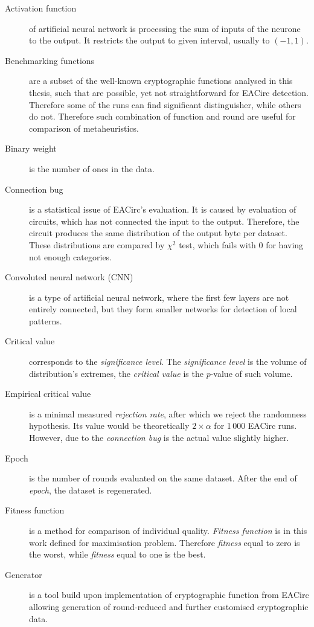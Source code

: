 \documentclass[
    digital,    %
    oneside,    %
    color,
    11pt,
    nocover,
    notable,
    nolof,
    nolot,
]{fithesis3}
\begin{document}
\begin{description}
    \item[Activation function] of artificial neural network is processing the sum of inputs of the neurone to the output. It restricts the output to given interval, usually to $(-1, 1)$.
    \item[Benchmarking functions] are a subset of the well-known cryptographic functions analysed in this thesis, such that are possible, yet not straightforward for EACirc detection. Therefore some of the runs can find significant distinguisher, while others do not. Therefore such combination of function and round are useful for comparison of metaheuristics.
    \item[Binary weight] is the number of ones in the data.
    \item[Connection bug] is a statistical issue of EACirc's evaluation. It is caused by evaluation of circuits, which has not connected the input to the output. Therefore, the circuit produces the same distribution of the output byte per dataset. These distributions are compared by $\chi^{2}$ test, which fails with 0 for having not enough categories.
    \item[Convoluted neural network (CNN)] is a type of artificial neural network, where the first few layers are not entirely connected, but they form smaller networks for detection of local patterns.
    \item[Critical value] corresponds to the \textit{significance level}. The \textit{significance level} is the volume of distribution's extremes, the \textit{critical value} is the $p$-value of such volume.
    \item[Empirical critical value] is a minimal measured \textit{rejection rate}, after which we reject the randomness hypothesis. Its value would be theoretically $2\times \alpha$  for 1\,000 EACirc runs. However, due to the \textit{connection bug} is the actual value slightly higher.
    \item[Epoch] is the number of rounds evaluated on the same dataset. After the end of \textit{epoch}, the dataset is regenerated.
    \item[Fitness function] is a method for comparison of individual quality. \textit{Fitness function} is in this work defined for maximisation problem. Therefore \textit{fitness} equal to zero is the worst, while \textit{fitness} equal to one is the best.
    \item[Generator] is a tool build upon implementation of cryptographic function from EACirc allowing generation of round-reduced and further customised cryptographic data.

\end{description}
\end{document}
